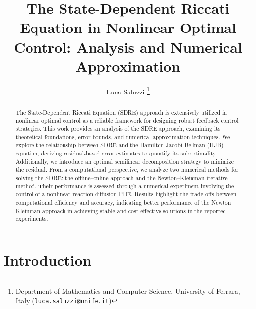 \documentclass{article}
\begin{document}
\title{The State-Dependent Riccati Equation in Nonlinear Optimal Control: Analysis and Numerical Approximation}


\author{
    Luca Saluzzi \thanks{Department of Mathematics and Computer Science, University of Ferrara, Italy (\texttt{luca.saluzzi@unife.it})}
}


\maketitle
\begin{abstract}
The State-Dependent Riccati Equation (SDRE) approach is extensively utilized in nonlinear optimal control as a reliable framework for designing robust feedback control strategies. This work provides an analysis of the SDRE approach, examining its theoretical foundations, error bounds, and numerical approximation techniques. We explore the relationship between SDRE and the Hamilton-Jacobi-Bellman (HJB) equation, deriving residual-based error estimates to quantify its suboptimality. Additionally, we introduce an optimal semilinear decomposition strategy to minimize the residual. From a computational perspective, we analyze two numerical methods for solving the SDRE: the offline–online approach and the Newton–Kleinman iterative method. Their performance is assessed through a numerical experiment involving the control of a nonlinear reaction-diffusion PDE. Results highlight the trade-offs between computational efficiency and accuracy, indicating better performance of the Newton–Kleinman approach in achieving stable and cost-effective solutions in the reported experiments.
\end{abstract}




\bigskip


\section{Introduction}
\end{document}
